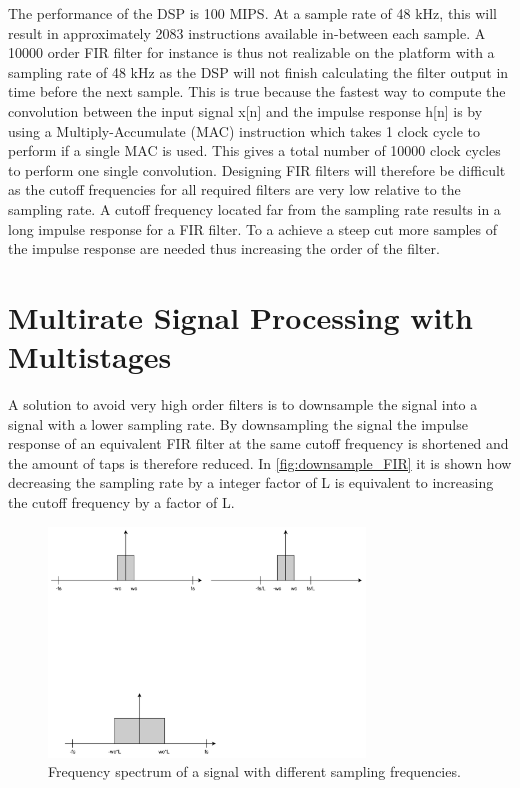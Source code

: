 The performance of the DSP is 100 MIPS. At a sample rate of 48 kHz, this will result in approximately 2083 instructions available in-between each sample. A 10000 order FIR filter for instance is thus not realizable on the platform with a sampling rate of 48 kHz as the DSP will not finish calculating the filter output in time before the next sample. This is true because the fastest way to compute the convolution between the input signal x[n] and the impulse response h[n] is by using a Multiply-Accumulate (MAC) instruction which takes 1 clock cycle to perform if a single MAC is used. This gives a total number of 10000 clock cycles to perform one single convolution. Designing FIR filters will therefore be difficult as the cutoff frequencies for all required filters are very low relative to the sampling rate. A cutoff frequency located far from the sampling rate results in a long impulse response for a FIR filter. To a achieve a steep cut more samples of the impulse response are needed thus increasing the order of the filter. 

\section{Multirate Signal Processing with Multistages}
A solution to avoid very high order filters is to downsample the signal into a signal with a lower sampling rate. By downsampling the signal the impulse response of an equivalent FIR filter at the same cutoff frequency is shortened and the amount of taps is therefore reduced. In \autoref{fig:downsample_FIR} it is shown how decreasing the sampling rate by a integer factor of L is equivalent to increasing the cutoff frequency by a factor of L.


\begin{figure}[H]
\centering
\includegraphics[width=0.75\textwidth]{figures/downsample_FIR.pdf}
\caption{Frequency spectrum of a signal with different sampling frequencies.}
\label{fig:downsample_FIR}
\end{figure}

